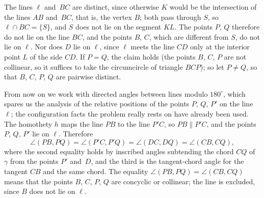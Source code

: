 {    The lines $\ell$ and~$BC$ are distinct, since otherwise $K$ would be the intersection of the lines $AB$ and~$BC$, that is, the vertex $B$; both pass through $S$, so $\ell \cap BC = \{S\}$, and $S$ does not lie on the segment $KL$. The points $P$, $Q$ therefore do not lie on the line $BC$, and the points $B$, $C$, which are different from $S$, do not lie on $\ell$. Nor does $D$ lie on $\ell$, since $\ell$ meets the line $CD$ only at the interior point $L$ of the side $CD$. If $P = Q$, the claim holds (the points $B$, $C$, $P$ are not collinear, so it suffices to take the circumcircle of triangle $BCP$); so let $P \neq Q$, so that $B$, $C$, $P$, $Q$ are pairwise distinct.

    From now on we work with directed angles between lines modulo $180^\circ$, which spares us the analysis of the relative positions of the points $P$, $Q$, $P'$ on the line $\ell$; the configuration facts the problem really rests on have already been used. The homothety $h$ maps the line $PB$ to the line $P'C$, so $PB \parallel P'C$, and the points $P$, $Q$, $P'$ lie on $\ell$. Therefore
    $$
    \angle(PB, PQ) = \angle(P'C, P'Q) = \angle(DC, DQ) = \angle(CB, CQ),
    $$
    where the second equality holds by inscribed angles subtending the chord $CQ$ of $\gamma$ from the points $P'$ and~$D$, and the third is the tangent-chord angle for the tangent $CB$ and the same chord. The equality $\angle(PB,PQ) = \angle(CB,CQ)$ means that the points $B$, $C$, $P$, $Q$ are concyclic or collinear; the line is excluded, since $B$ does not lie on $\ell$.
}

